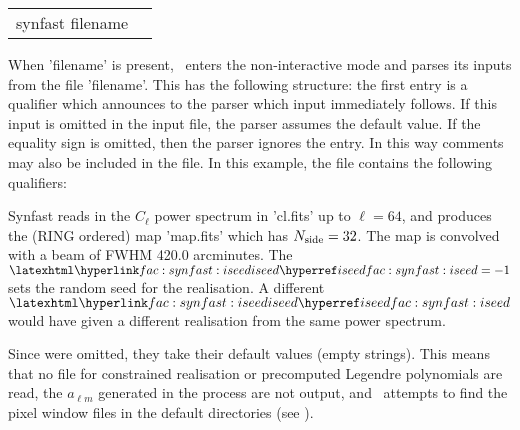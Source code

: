 \begin{examples}{2}
{
\begin{tabular}{ll} %
synfast  filename \\
\end{tabular}
}
{When 'filename' is present, \thedocid\ enters the non-interactive mode and parses
its inputs from the file 'filename'. This has the following
structure: the first entry is a qualifier which announces to the parser
which input immediately follows. If this input is omitted in the
input file, the parser assumes the default value.
If the equality sign is omitted, then the parser ignores the entry.
In this way comments may also be included in the file.
In this example, the file contains the following qualifiers:\hfill\newline
{}

Synfast reads in the $C_{\ell}$ power spectrum in 'cl.fits' up to $\ell=64$, and
produces the (RING ordered) map
'map.fits' which has $N_{\mathrm{side}}=32$.
The map is convolved with a beam of FWHM 420.0 arcminutes. The $\mylink{fac:synfast:iseed}{iseed}%
=-1$ sets
the random seed for the realisation. A different $\mylink{fac:synfast:iseed}{iseed}%
$ would have given a different 
realisation from the same power spectrum.

Since \hfill\newline
{}
were omitted, they take their default values (empty strings). 
This means that no file for constrained realisation or precomputed
Legendre polynomials are read, the $a_{\ell m}$ generated in the process are not
output, and \thedocid\ attempts to find the pixel
window files in the default directories (see 
%
).
}
\end{examples}

